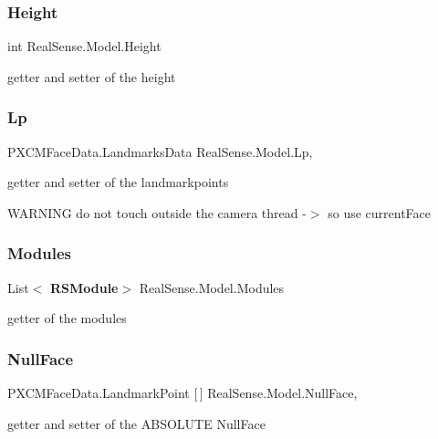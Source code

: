 \subsubsection{Height}
{\footnotesize\ttfamily int Real\+Sense.\+Model.\+Height\hspace{0.3cm}{\ttfamily [get]}}

getter and setter of the height \mbox{\label{class_real_sense_1_1_model_a3e349d000d00015a340954ec3be977ea}} 
\subsubsection{Lp}
{\footnotesize\ttfamily P\+X\+C\+M\+Face\+Data.\+Landmarks\+Data Real\+Sense.\+Model.\+Lp\hspace{0.3cm}{\ttfamily [get]}, {\ttfamily [set]}}

getter and setter of the landmarkpoints

W\+A\+R\+N\+I\+NG do not touch outside the camera thread -\/$>$ so use current\+Face \mbox{\label{class_real_sense_1_1_model_a9664e53331481e9cc45ad6d3540c218c}} 
\subsubsection{Modules}
{\footnotesize\ttfamily List$<$\textbf{ R\+S\+Module}$>$ Real\+Sense.\+Model.\+Modules\hspace{0.3cm}{\ttfamily [get]}}

getter of the modules \mbox{\label{class_real_sense_1_1_model_af626df64a18cb2fcf4cbc06ffbadfa17}} 
\subsubsection{Null\+Face}
{\footnotesize\ttfamily P\+X\+C\+M\+Face\+Data.\+Landmark\+Point [$\,$] Real\+Sense.\+Model.\+Null\+Face\hspace{0.3cm}{\ttfamily [get]}, {\ttfamily [set]}}

getter and setter of the A\+B\+S\+O\+L\+U\+TE Null\+Face \mbox{\label{class_real_sense_1_1_model_ad06548f5b1e3b3bfeaca2635d2b24fc6}} 
